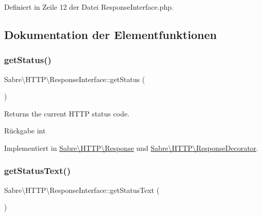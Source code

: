 Definiert in Zeile 12 der Datei Response\+Interface.\+php.



\subsection{Dokumentation der Elementfunktionen}
\mbox{\label{interface_sabre_1_1_h_t_t_p_1_1_response_interface_a4424cb29068d23ac01d92fdaf97351c8}} 
\subsubsection{\texorpdfstring{get\+Status()}{getStatus()}}
{\footnotesize\ttfamily Sabre\textbackslash{}\+H\+T\+T\+P\textbackslash{}\+Response\+Interface\+::get\+Status (\begin{DoxyParamCaption}{ }\end{DoxyParamCaption})}

Returns the current H\+T\+TP status code.

\begin{DoxyReturn}{Rückgabe}
int 
\end{DoxyReturn}


Implementiert in \mbox{\hyperlink{class_sabre_1_1_h_t_t_p_1_1_response_afe2cf93ce624d99a248a1aaf6bd2986b}{Sabre\textbackslash{}\+H\+T\+T\+P\textbackslash{}\+Response}} und \mbox{\hyperlink{class_sabre_1_1_h_t_t_p_1_1_response_decorator_ac5b7d13566a0597fd437ac8d72a5becc}{Sabre\textbackslash{}\+H\+T\+T\+P\textbackslash{}\+Response\+Decorator}}.

\mbox{\label{interface_sabre_1_1_h_t_t_p_1_1_response_interface_a5fe5d34d36b2fa98e074a463f8368427}} 
\subsubsection{\texorpdfstring{get\+Status\+Text()}{getStatusText()}}
{\footnotesize\ttfamily Sabre\textbackslash{}\+H\+T\+T\+P\textbackslash{}\+Response\+Interface\+::get\+Status\+Text (\begin{DoxyParamCaption}{ }\end{DoxyParamCaption})}


